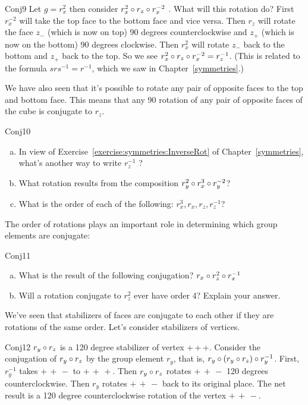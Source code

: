 \begin {example}{Conj9} 
Let  $g=r_x^2$ then consider $r_x^2\circ r_z\circ r_x^{-2}$ .   What will this rotation do? First $r_x^{-2}$ will take the top face to the bottom face and vice versa. Then $r_z$ will rotate the face $z_-$ (which is now on top)  90 degrees counterclockwise and  $z_+$ (which is now on the bottom) 90 degrees clockwise.  Then $r_x^2$ will rotate $z_-$ back to the bottom and $z_+$ back to the top.  So we see $r_x^2\circ r_z\circ r_x^{-2} = r_z^{-1}$. (This is related to the formula $s r s^{-1} = r^{-1}$, which we saw in Chapter~\ref{symmetries}.)  
\end{example}

We have also seen that it's possible to rotate any pair of opposite faces to the top and bottom face. This means that any 90 rotation of any pair of opposite faces of the cube is conjugate to $r_z$.  

\begin {exercise}{Conj10}
\begin {enumerate} [(a)]
\item In view of Exercise~\ref{exercise:symmetries:InverseRot} of Chapter~\ref{symmetries}, what's another way to write $r_z^{-1}$ ?  
\item What rotation results from the composition  $r_y^2\circ r_x^3\circ r_y^{-2}$?
\item What is the order of each of the following: $r_x^3, r_x, r_z, r_z^{-1}$? 
\end{enumerate}
\end{exercise}

The order of rotations plays an important role in determining which group elements are conjugate:

\begin {exercise}{Conj11}
\begin {enumerate}[(a)]
\item What is the result of the following conjugation? $r_x\circ r_z^2 \circ r_x^{-1}$
\item Will a rotation conjugate to $r_z^2$ ever have order 4?  Explain your answer.
\end {enumerate}
\end{exercise}

We've seen that stabilizers of faces are conjugate to each other if they are rotations of the same order.  Let's consider stabilizers of vertices.

\begin {example}{Conj12}
 $r_y\circ r_z$ is a 120 degree stabilizer of vertex {+\,+\,+}.  Consider the conjugation of $r_y\circ r_z$ by the group element $r_y$, that is,  $r_y\circ (r_y\circ r_z)\circ r_y^{-1}$. First, $r_y^{-1}$ takes ${+\,+\,-}$ to ${+\,+\,+}$.  Then $r_y\circ r_z$ rotates ${+\,+\,-}$ 120 degrees counterclockwise. Then $r_y$ rotates ${+\,+\,-}$ back to its original place.  The net result is a 120 degree counterclockwise rotation of the vertex ${+\,+\,-}$.
\end{example}

